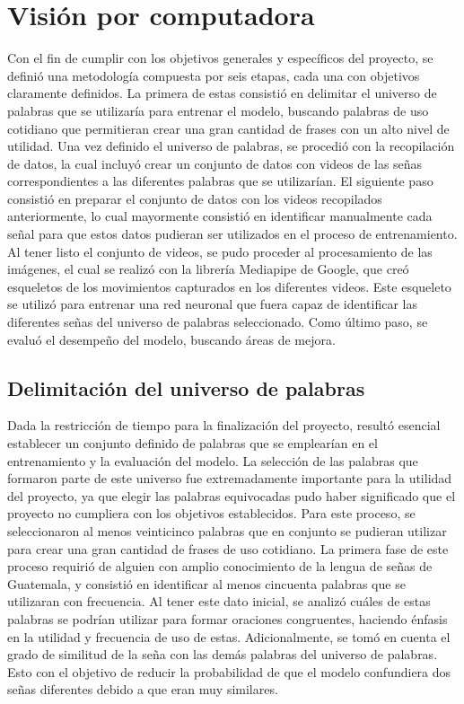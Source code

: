 \section{Visión por computadora} 

Con el fin de cumplir con los objetivos generales y específicos del proyecto, se definió una metodología compuesta por seis etapas, cada una con objetivos claramente definidos.  
La primera de estas consistió en delimitar el universo de palabras que se utilizaría para entrenar el modelo, buscando palabras de uso cotidiano que permitieran crear una gran cantidad de frases con un alto nivel de utilidad.  
Una vez definido el universo de palabras, se procedió con la recopilación de datos, la cual incluyó crear un conjunto de datos con videos de las señas correspondientes a las diferentes palabras que se utilizarían.  
El siguiente paso consistió en preparar el conjunto de datos con los videos recopilados anteriormente, lo cual mayormente consistió en identificar manualmente cada señal para que estos datos pudieran ser utilizados en el proceso de entrenamiento.  
Al tener listo el conjunto de videos, se pudo proceder al procesamiento de las imágenes, el cual se realizó con la librería Mediapipe de Google, que creó esqueletos de los movimientos capturados en los diferentes videos.  
Este esqueleto se utilizó para entrenar una red neuronal que fuera capaz de identificar las diferentes señas del universo de palabras seleccionado.  
Como último paso, se evaluó el desempeño del modelo, buscando áreas de mejora.  

\subsection{Delimitación del universo de palabras}
Dada la restricción de tiempo para la finalización del proyecto, resultó esencial establecer un conjunto definido de palabras que se emplearían en el entrenamiento y la evaluación del modelo.
La selección de las palabras que formaron parte de este universo fue extremadamente importante para la utilidad del proyecto, ya que elegir las palabras equivocadas pudo haber significado que el proyecto no cumpliera con los objetivos establecidos.
Para este proceso, se seleccionaron al menos veinticinco palabras que en conjunto se pudieran utilizar para crear una gran cantidad de frases de uso cotidiano.
La primera fase de este proceso requirió de alguien con amplio conocimiento de la lengua de señas de Guatemala, y consistió en identificar al menos cincuenta palabras que se utilizaran con frecuencia.
Al tener este dato inicial, se analizó cuáles de estas palabras se podrían utilizar para formar oraciones congruentes, haciendo énfasis en la utilidad y frecuencia de uso de estas.
Adicionalmente, se tomó en cuenta el grado de similitud de la seña con las demás palabras del universo de palabras. Esto con el objetivo de reducir la probabilidad de que el modelo confundiera dos señas diferentes debido a que eran muy similares.

